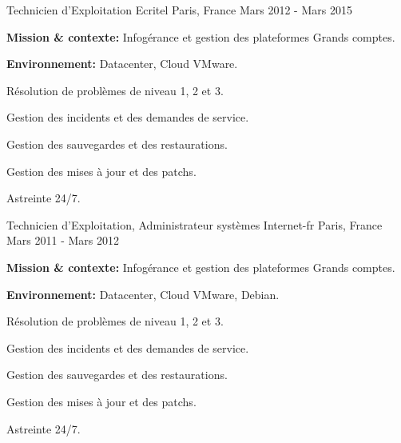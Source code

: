 \begin{cventries}
\cventry
{Technicien d'Exploitation} %
{Ecritel} %
{Paris, France} %
{Mars 2012 - Mars 2015} %
{
  \begin{cvitems} %
    \item {\textbf{Mission \& contexte:} Infogérance et gestion des plateformes Grands comptes.}
    \item {\textbf{Environnement:} Datacenter, Cloud VMware.}
    \item {Résolution de problèmes de niveau 1, 2 et 3.}
    \item {Gestion des incidents et des demandes de service.}
    \item {Gestion des sauvegardes et des restaurations.}
    \item {Gestion des mises à jour et des patchs.}
    \item {Astreinte 24/7.}
  \end{cvitems}
}
\cventry
{Technicien d'Exploitation, Administrateur systèmes} %
{Internet-fr} %
{Paris, France} %
{Mars 2011 - Mars 2012} %
{
  \begin{cvitems} %
    \item {\textbf{Mission \& contexte:} Infogérance et gestion des plateformes Grands comptes.}
    \item {\textbf{Environnement:} Datacenter, Cloud VMware, Debian.}
    \item {Résolution de problèmes de niveau 1, 2 et 3.}
    \item {Gestion des incidents et des demandes de service.}
    \item {Gestion des sauvegardes et des restaurations.}
    \item {Gestion des mises à jour et des patchs.}
    \item {Astreinte 24/7.}
  \end{cvitems}
}
\end{cventries}